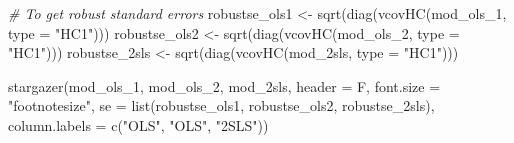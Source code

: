 \documentclass[11pt,preprint, authoryear]{elsarticle}
\numberwithin{equation}{section}
\numberwithin{figure}{section}
\numberwithin{table}{section}
\newenvironment{Shaded}{\begin{snugshade}}{\end{snugshade}}
\newcommand{\AttributeTok}[1]{\textcolor[rgb]{0.77,0.63,0.00}{#1}}
\newcommand{\CommentTok}[1]{\textcolor[rgb]{0.56,0.35,0.01}{\textit{#1}}}
\newcommand{\FunctionTok}[1]{\textcolor[rgb]{0.00,0.00,0.00}{#1}}
\newcommand{\NormalTok}[1]{#1}
\newcommand{\OtherTok}[1]{\textcolor[rgb]{0.56,0.35,0.01}{#1}}
\newcommand{\StringTok}[1]{\textcolor[rgb]{0.31,0.60,0.02}{#1}}
\begin{document}
\begin{Shaded}
\begin{Highlighting}[]
\CommentTok{\# To get robust standard errors}
\NormalTok{robustse\_ols1 }\OtherTok{\textless{}{-}} \FunctionTok{sqrt}\NormalTok{(}\FunctionTok{diag}\NormalTok{(}\FunctionTok{vcovHC}\NormalTok{(mod\_ols\_1, }\AttributeTok{type =} \StringTok{"HC1"}\NormalTok{)))}
\NormalTok{robustse\_ols2 }\OtherTok{\textless{}{-}} \FunctionTok{sqrt}\NormalTok{(}\FunctionTok{diag}\NormalTok{(}\FunctionTok{vcovHC}\NormalTok{(mod\_ols\_2, }\AttributeTok{type =} \StringTok{"HC1"}\NormalTok{)))}
\NormalTok{robustse\_2sls }\OtherTok{\textless{}{-}} \FunctionTok{sqrt}\NormalTok{(}\FunctionTok{diag}\NormalTok{(}\FunctionTok{vcovHC}\NormalTok{(mod\_2sls, }\AttributeTok{type =} \StringTok{"HC1"}\NormalTok{)))}
\end{Highlighting}
\end{Shaded}

\begin{Shaded}
\begin{Highlighting}[]
\FunctionTok{stargazer}\NormalTok{(mod\_ols\_1, mod\_ols\_2, mod\_2sls, }\AttributeTok{header =}\NormalTok{ F, }\AttributeTok{font.size =} \StringTok{"footnotesize"}\NormalTok{,}
    \AttributeTok{se =} \FunctionTok{list}\NormalTok{(robustse\_ols1, robustse\_ols2, robustse\_2sls), }\AttributeTok{column.labels =} \FunctionTok{c}\NormalTok{(}\StringTok{"OLS"}\NormalTok{,}
        \StringTok{"OLS"}\NormalTok{, }\StringTok{"2SLS"}\NormalTok{))}
\end{Highlighting}
\end{Shaded}
\end{document}
